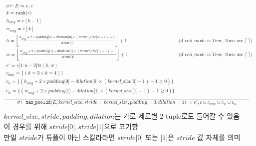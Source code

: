 \documentclass{article}
\makeatletter
\newcommand{\x}{\times}
\newcommand{\Rar}{\Rightarrow}
\newcommand{\mtt}[1]{\mathtt{#1}}
\newcommand{\op}[2]{\mtt{#1(}#2\mtt{)}}
\newcommand{\conc}{\mtt{@}}
\newcommand{\ind}[1]{\mtt{[}#1\mtt{]}}
\newcommand{\indr}[2]{\mtt{[}#1\mtt{:}#2\mtt{]}}
\makeatother
\begin{document}
\begin{align*}
  \frac
  {
    \begin{array}{ll}
      \sigma \vdash E \Rar e, c \\
      k = \op{rank}{e} \\
      h_{orig} = e[k-1] \\
      w_{orig} = e[k] \\
      h = \left\lfloor \frac{h_{orig} + 2 \x padding \ind{0} - dilation \ind{0}
        \x (kernel\_size \ind{0} - 1) - 1}{stride \ind{0}} \right\rfloor + 1 &
        \text{(if $ceil\_mode$ is $True$, then use $\lceil \cdot \rceil$)}\\
      w = \left\lfloor \frac{w_{orig} + 2 \x padding \ind{1} - dilation \ind{1}
        \x (kernel\_size \ind{1} - 1) - 1}{stride \ind{1}} \right\rfloor + 1 &
        \text{(if $ceil\_mode$ is $True$, then use $\lceil \cdot \rceil$)}\\
      e' = e\indr{1}{k-2} \conc (h, w) \\
      c_{dim} = \{ (k = 3 \lor k = 4) \} \\
      c_h = \{ (h_{orig} + 2 \x padding \ind{0} - dilation \ind{0}
        \x (kernel\_size \ind{0} - 1) - 1 \geq 0) \} \\
      c_w = \{ (w_{orig} + 2 \x padding \ind{1} - dilation \ind{1}
        \x (kernel\_size \ind{1} - 1) - 1 \geq 0) \} \\
    \end{array}
  }
  {
    \begin{array}{c}
      \sigma \vdash \op{max\_pool2d}{E, kernel\_size, stride=kernel\_size,
        padding=0, dilation=1}
        \Rar e', c \cup c_{dim} \cup c_w \cup c_h 
    \end{array}
  } \\
  \\
  \text{$kernel\_size, stride, padding, dilation$는 가로-세로별 2-tuple로도 들어갈
  수 있음} \\
  \text{이 경우를 위해 $stride\ind{0}, stride\ind{1}$으로 표기함} \\
  \text{만일 $stride$가 튜플이 아닌 스칼라라면 $stride\ind{0}$ 또는 $\ind{1}$은
    $stride$ 값 자체를 의미}
\end{align*}
\end{document}
